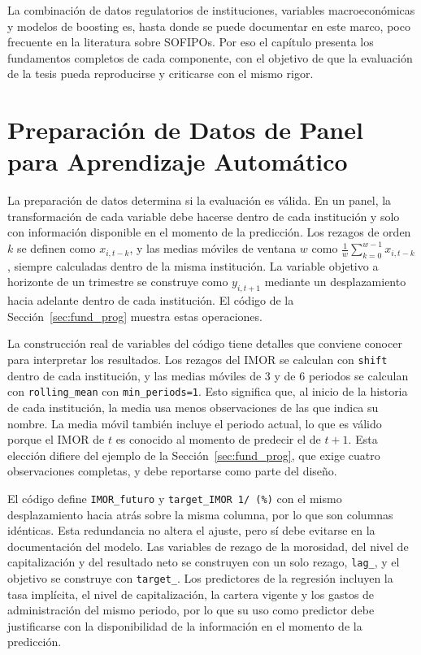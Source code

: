 La combinación de datos regulatorios de instituciones, variables macroeconómicas y modelos de boosting es, hasta donde se puede documentar en este marco, poco frecuente en la literatura sobre SOFIPOs. Por eso el capítulo presenta los fundamentos completos de cada componente, con el objetivo de que la evaluación de la tesis pueda reproducirse y criticarse con el mismo rigor.

\section{Preparación de Datos de Panel para Aprendizaje Automático}\label{sec:prep_datos}

La preparación de datos determina si la evaluación es válida. En un panel, la transformación de cada variable debe hacerse dentro de cada institución y solo con información disponible en el momento de la predicción. Los rezagos de orden $k$ se definen como $x_{i,t-k}$, y las medias móviles de ventana $w$ como $\frac{1}{w}\sum_{k=0}^{w-1} x_{i,t-k}$, siempre calculadas dentro de la misma institución. La variable objetivo a horizonte de un trimestre se construye como $y_{i,t+1}$ mediante un desplazamiento hacia adelante dentro de cada institución. El código de la Sección~\ref{sec:fund_prog} muestra estas operaciones.

La construcción real de variables del código tiene detalles que conviene conocer para interpretar los resultados. Los rezagos del IMOR se calculan con \texttt{shift} dentro de cada institución, y las medias móviles de 3 y de 6 periodos se calculan con \texttt{rolling\_mean} con \texttt{min\_periods=1}. Esto significa que, al inicio de la historia de cada institución, la media usa menos observaciones de las que indica su nombre. La media móvil también incluye el periodo actual, lo que es válido porque el IMOR de $t$ es conocido al momento de predecir el de $t+1$. Esta elección difiere del ejemplo de la Sección~\ref{sec:fund_prog}, que exige cuatro observaciones completas, y debe reportarse como parte del diseño.

El código define \texttt{IMOR\_futuro} y \texttt{target\_IMOR 1/ (\%)} con el mismo desplazamiento hacia atrás sobre la misma columna, por lo que son columnas idénticas. Esta redundancia no altera el ajuste, pero sí debe evitarse en la documentación del modelo. Las variables de rezago de la morosidad, del nivel de capitalización y del resultado neto se construyen con un solo rezago, \texttt{lag\_}, y el objetivo se construye con \texttt{target\_}. Los predictores de la regresión incluyen la tasa implícita, el nivel de capitalización, la cartera vigente y los gastos de administración del mismo periodo, por lo que su uso como predictor debe justificarse con la disponibilidad de la información en el momento de la predicción.

